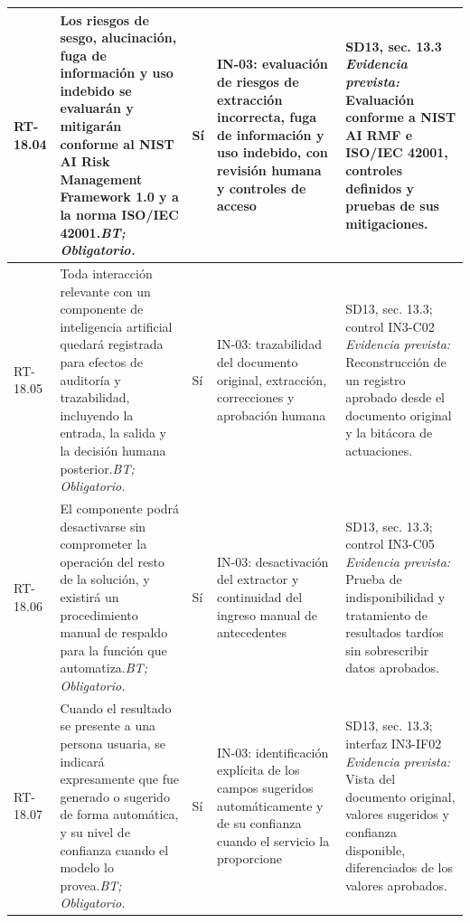 \begin{paginaHorizontalSynaptix}
\begin{longtable}{|L{0.09\AnchoMatrizTDoce}|L{0.385\AnchoMatrizTDoce}|L{0.065\AnchoMatrizTDoce}|L{0.18\AnchoMatrizTDoce}|L{0.28\AnchoMatrizTDoce}|}
RT-\allowbreak{}18.\allowbreak{}04 &
Los riesgos de sesgo, alucinación, fuga de información y uso indebido se evaluarán y mitigarán conforme al NIST AI Risk Management Framework 1.0 y a la norma ISO/IEC 42001.\newline\textit{BT; Obligatorio.} &
Sí &
IN-03: evaluación de riesgos de extracción incorrecta, fuga de información y uso indebido, con revisión humana y controles de acceso &
SD13, sec. 13.3 \newline\textit{Evidencia prevista:} Evaluación conforme a NIST AI RMF e ISO/IEC 42001, controles definidos y pruebas de sus mitigaciones. \\ \hline

RT-\allowbreak{}18.\allowbreak{}05 &
Toda interacción relevante con un componente de inteligencia artificial quedará registrada para efectos de auditoría y trazabilidad, incluyendo la entrada, la salida y la decisión humana posterior.\newline\textit{BT; Obligatorio.} &
Sí &
IN-03: trazabilidad del documento original, extracción, correcciones y aprobación humana &
SD13, sec. 13.3; control IN3-C02 \newline\textit{Evidencia prevista:} Reconstrucción de un registro aprobado desde el documento original y la bitácora de actuaciones. \\ \hline

RT-\allowbreak{}18.\allowbreak{}06 &
El componente podrá desactivarse sin comprometer la operación del resto de la solución, y existirá un procedimiento manual de respaldo para la función que automatiza.\newline\textit{BT; Obligatorio.} &
Sí &
IN-03: desactivación del extractor y continuidad del ingreso manual de antecedentes &
SD13, sec. 13.3; control IN3-C05 \newline\textit{Evidencia prevista:} Prueba de indisponibilidad y tratamiento de resultados tardíos sin sobrescribir datos aprobados. \\ \hline

RT-\allowbreak{}18.\allowbreak{}07 &
Cuando el resultado se presente a una persona usuaria, se indicará expresamente que fue generado o sugerido de forma automática, y su nivel de confianza cuando el modelo lo provea.\newline\textit{BT; Obligatorio.} &
Sí &
IN-03: identificación explícita de los campos sugeridos automáticamente y de su confianza cuando el servicio la proporcione &
SD13, sec. 13.3; interfaz IN3-IF02 \newline\textit{Evidencia prevista:} Vista del documento original, valores sugeridos y confianza disponible, diferenciados de los valores aprobados. \\ \hline


\end{longtable}
\end{paginaHorizontalSynaptix}

